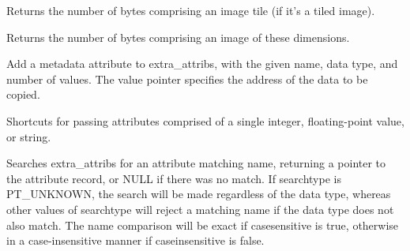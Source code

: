 Returns the number of bytes comprising an image tile (if it's a tiled image).
\apiend

Returns the number of bytes comprising an image of these dimensions.
\apiend


Add a metadata attribute to {\kw extra_attribs}, with the given name,
data type, and number of values.  The {\kw value} pointer specifies
the address of the data to be copied.
\apiend

Shortcuts for passing attributes comprised of a single integer,
floating-point value, or string.
\apiend


Searches {\kw extra_attribs} for an attribute matching {\kw name},
returning a pointer to the attribute record, or NULL if there was no
match.  If {\kw searchtype} is {\kw PT_UNKNOWN}, the search will be made
regardless of the data type, whereas other values of {\kw searchtype}
will reject a matching name if the data type does not also match.  The
name comparison will be exact if {\kw casesensitive} is true, otherwise
in a case-insensitive manner if {\kw caseinsensitive} is false.
\apiend





\chapwidthend
